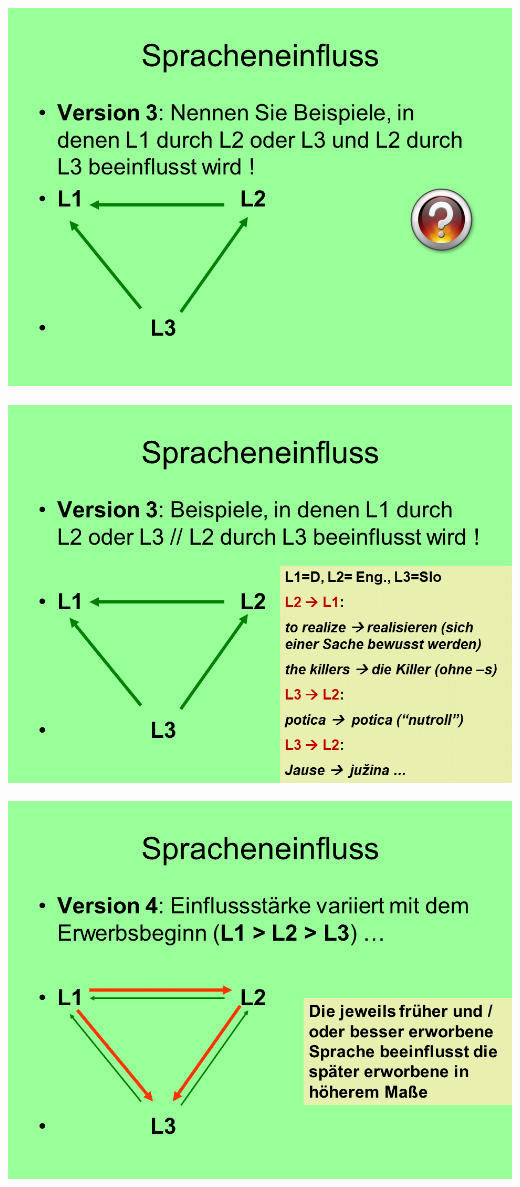 \documentclass[
  letterpaper,
]{scrbook}
\begin{document}
\includegraphics[width=1\textwidth,height=\textheight]{./pictures/02_Spracheneinfluss_Sprachentrennung/Diapozitiv8.PNG}

\includegraphics[width=1\textwidth,height=\textheight]{./pictures/02_Spracheneinfluss_Sprachentrennung/Diapozitiv9.PNG}

\includegraphics[width=1\textwidth,height=\textheight]{./pictures/02_Spracheneinfluss_Sprachentrennung/Diapozitiv10.PNG}
\end{document}
